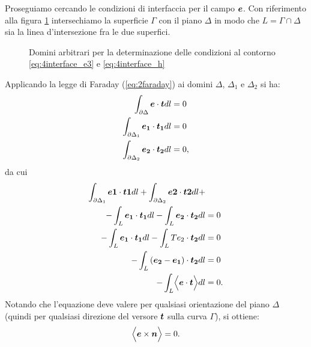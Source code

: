Proseguiamo cercando le condizioni di interfaccia per il campo $\boldsymbol{e}$. Con riferimento alla figura \ref{fig:4.8} intersechiamo la superficie $\Gamma$ con il piano $\Delta$ in modo che $L = \Gamma \cap \Delta$ sia la linea d'intersezione fra le due superfici.

\begin{figure}[htp]
\centering
\caption{Domini arbitrari per la determinazione delle condizioni al contorno \eqref{eq:4interface_e3} e \eqref{eq:4interface_h}}
\label{fig:4.8}
\end{figure}

Applicando la legge di Faraday (\eqref{eq:2faraday}) ai domini $\Delta$, $\Delta_1$ e $\Delta_2$ si ha:
\begin{align}
\label{eq:4interface_e}
\int_{\partial \Delta} \boldsymbol{e}\cdot \boldsymbol{t} dl &= 0\\
\int_{\partial \Delta_1} \boldsymbol{e_1}\cdot \boldsymbol{t_1} dl &= 0\\
\int_{\partial \Delta_2} \boldsymbol{e_2}\cdot \boldsymbol{t_2} dl &= 0,
\end{align}
da cui
\begin{align}
\label{eq:4interface_e2}
\int_{\partial \Delta_1} \boldsymbol{e1}\cdot \boldsymbol{t1} dl + \int_{\partial \Delta_2} \boldsymbol{e2}\cdot \boldsymbol{t2} dl + &\nonumber\\
- \int_{L} \boldsymbol{e_1}\cdot \boldsymbol{t_1} dl - \int_{L} \boldsymbol{e_2}\cdot \boldsymbol{t_2} dl &= 0 \nonumber\\
- \int_{L} \boldsymbol{e_1}\cdot \boldsymbol{t_1} dl - \int_{L} T{e_2}\cdot \boldsymbol{t_2} dl &= 0 \nonumber\\
- \int_{L} \left( \boldsymbol{e_2}-\boldsymbol{e_1}\right) \cdot \boldsymbol{t_2} dl &= 0 \nonumber\\
- \int_{L} \Bigl\langle\boldsymbol{e} \cdot \boldsymbol{t} \Bigr\rangle dl &= 0.
\end{align}
Notando che l'equazione deve valere per qualsiasi orientazione del piano $\Delta$ (quindi per qualsiasi direzione del versore $\boldsymbol{t}$ sulla curva $\Gamma$), si ottiene:
\begin{equation}
\label{eq:4interface_e3}
\Bigl\langle\boldsymbol{e} \times \boldsymbol{n} \Bigr\rangle = 0.
\end{equation}


